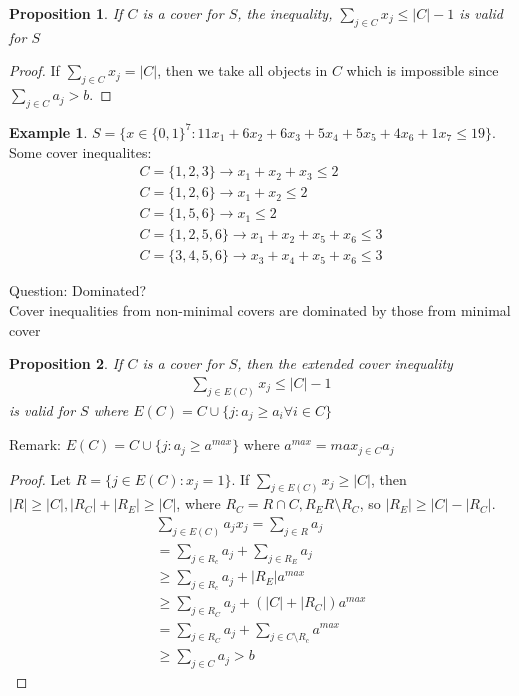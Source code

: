 \documentclass{article}
\theoremstyle{plain}
\newtheorem{prop}{Proposition}
\theoremstyle{definition}
\newtheorem{eg}{Example}
\begin{document}
\begin{prop}
    If $C$ is a cover for $S$, the inequality,
    $\sum_{j\in C}x_j \leq |C| - 1$ is valid for $S$
\end{prop}

\begin{proof}
    If $\sum_{j\in C}x_j = |C|$, then we take all objects in $C$ which is impossible
    since $\sum_{j\in C}a_j > b$.
\end{proof}

\begin{eg}
    $S = \{x\in\{0,1\}^7: 11x_1 + 6x_2 + 6x_3 + 5x_4 + 5x_5 + 4x_6 + 1x_7 \leq 19\}$.
    Some cover inequalites:
    \begin{align*}
        C = \{1, 2, 3\} \rightarrow x_1 + x_2 + x_3 \leq 2\\
        C = \{1, 2, 6\} \rightarrow x_1 + x_2 \leq 2\\
        C = \{1, 5, 6\} \rightarrow x_1 \leq 2\\
        C = \{1, 2, 5, 6\} \rightarrow x_1 + x_2 + x_5 + x_6 \leq 3\\
        C = \{3, 4, 5, 6\} \rightarrow x_3 + x_4 + x_5 + x_6 \leq 3
    \end{align*}
\end{eg}

Question: Dominated?\\
Cover inequalities from non-minimal covers are dominated by those from
minimal cover

\begin{prop}
    If $C$ is a cover for $S$, then the extended cover inequality
    \begin{align*}
        \sum_{j\in E(C)} x_j \leq |C| -1
    \end{align*}
    is valid for $S$ where $E(C) = C \cup \{j: a_j\geq a_i \forall i\in C\}$
\end{prop}

Remark: $E(C) = C \cup \{j: a_j \geq a^{max}\}$ where $a^{max} = max_{j\in C}a_j$
\begin{proof}
    Let $R = \{j\in E(C): x_j = 1\}$. If $\sum_{j\in E(C)} x_j \geq |C|$, then
    $|R| \geq |C|, |R_C| + |R_E| \geq |C|$, where $R_C = R\cap C, R_E R\setminus R_C$,
    so $|R_E| \geq |C| - |R_C|$.
    \begin{align*}
        \sum_{j\in E(C)} a_jx_j = \sum_{j\in R} a_j\\
        = \sum_{j\in R_c}a_j +  \sum_{j\in R_E}a_j\\
        \geq  \sum_{j\in R_c} a_j + |R_E|a^{max}\\
        \geq \sum_{j\in R_C}a_j + (|C| + |R_C|)a^{max}\\
        = \sum_{j\in R_C}a_j + \sum_{j\in C\setminus R_c}a^{max}\\
        \geq \sum_{j\in C} a_j > b
    \end{align*}
\end{proof}
\end{document}
